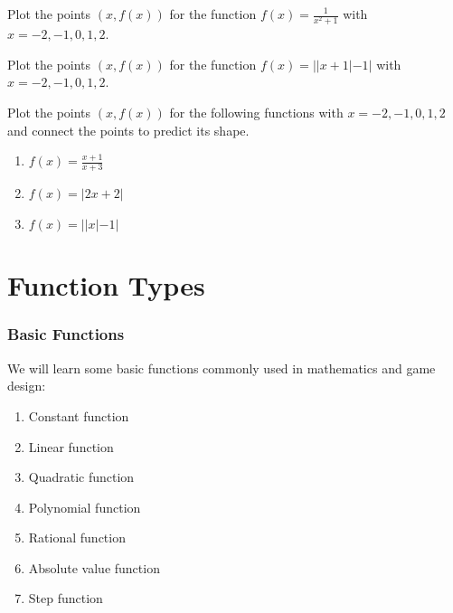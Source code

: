 \begin{frame}[t]
\begin{ex}
Plot the points $(x,f(x))$ for the function $f(x) = \frac{1}{x^2+1}$ with $x=-2,-1,0,1,2$.
\end{ex}
\begin{sol}
\end{sol}
\end{frame}


\begin{frame}[t]
\begin{ex}
Plot the points $(x,f(x))$ for the function $f(x) = | |x+1| - 1 |$ with $x=-2,-1,0,1,2$.
\end{ex}
\begin{sol}
\end{sol}
\end{frame}


\begin{frame}
\begin{exercisebox}{}{}
Plot the points $(x,f(x))$ for the following functions with $x=-2,-1,0,1,2$ and connect the points to predict its shape.
\begin{enumerate}
\item $f(x) = \frac{x+1}{x+3}$
\item $f(x) = |2x+2|$
\item $f(x) = ||x|-1|$
\end{enumerate}
\end{exercisebox}
\end{frame}

\section[Types]{Function Types}
\frame{\sectionpage}

\begin{frame}
\frametitle{Basic Functions}
We will learn some basic functions commonly used in mathematics and game design:
\begin{enumerate}
\item Constant function
\item Linear function
\item Quadratic function
\item Polynomial function
\item Rational function
\item Absolute value function
\item Step function
\end{enumerate}
\end{frame}

